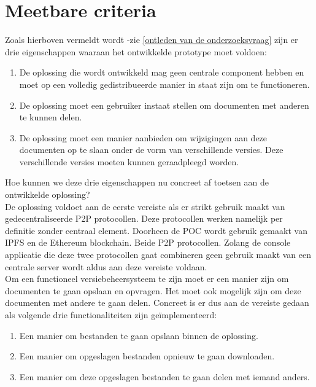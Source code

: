 \section{Meetbare criteria}
Zoals hierboven vermeldt wordt -zie \ref{ontleden van de onderzoeksvraag} zijn er drie eigenschappen waaraan het ontwikkelde prototype moet voldoen:

\begin{enumerate}
	\item De oplossing die wordt ontwikkeld mag geen centrale component hebben en moet op een volledig gedistribueerde manier in staat zijn om te functioneren.
	\item De oplossing moet een gebruiker instaat stellen om documenten met anderen te kunnen delen.
	\item De oplossing moet een manier aanbieden om wijzigingen aan deze documenten op te slaan onder de vorm van verschillende versies. Deze verschillende versies moeten kunnen geraadpleegd worden.
\end{enumerate}

Hoe kunnen we deze drie eigenschappen nu concreet af toetsen aan de ontwikkelde oplossing?\\

De oplossing voldoet aan de eerste vereiste als er strikt gebruik maakt van gedecentraliseerde P2P protocollen. Deze protocollen werken namelijk per definitie zonder centraal element. Doorheen de POC wordt gebruik gemaakt van IPFS en de Ethereum blockchain. Beide P2P protocollen. Zolang de console applicatie die deze twee protocollen gaat combineren geen gebruik maakt van een centrale server wordt aldus aan deze vereiste voldaan.\\

Om een functioneel versiebeheersysteem te zijn moet er een manier zijn om documenten te gaan opslaan en opvragen. Het moet ook mogelijk zijn om deze documenten met andere te gaan delen. Concreet is er dus aan de vereiste gedaan als volgende drie functionaliteiten zijn geïmplementeerd:

\begin{enumerate}
\item Een manier om bestanden te gaan opslaan binnen de oplossing.
\item Een manier om opgeslagen bestanden opnieuw te gaan downloaden.
\item Een manier om deze opgeslagen bestanden te gaan delen met iemand anders.
\end{enumerate}

